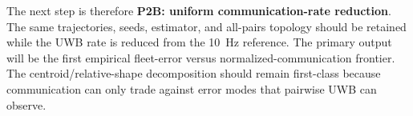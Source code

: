 The next step is therefore \textbf{P2B: uniform communication-rate reduction}. The same trajectories, seeds, estimator, and all-pairs topology should be retained while the UWB rate is reduced from the \SI{10}{Hz} reference. The primary output will be the first empirical fleet-error versus normalized-communication frontier. The centroid/relative-shape decomposition should remain first-class because communication can only trade against error modes that pairwise UWB can observe.
